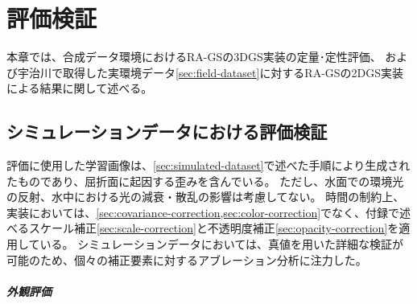 \newpage
\chapter{評価検証}\label{chap:evaluation}
本章では、合成データ環境におけるRA-GSの3DGS実装の定量･定性評価、
および宇治川で取得した実環境データ\cref{sec:field-dataset}に対するRA-GSの2DGS実装による結果に関して述べる。

\section{シミュレーションデータにおける評価検証}\label{sec:eval_simulated}


評価に使用した学習画像は、\cref{sec:simulated-dataset}で述べた手順により生成されたものであり、屈折面に起因する歪みを含んでいる。
ただし、水面での環境光の反射、水中における光の減衰・散乱の影響は考慮してない。
時間の制約上、実装においては、\cref{sec:covariance-correction,sec:color-correction}でなく、付録で述べるスケール補正\cref{sec:scale-correction}と不透明度補正\cref{sec:opacity-correction}を適用している。
シミュレーションデータにおいては、真値を用いた詳細な検証が可能のため、個々の補正要素に対するアブレーション分析に注力した。

\paragraph{外観評価}\label{subsec:eval_simulated_appearance}

